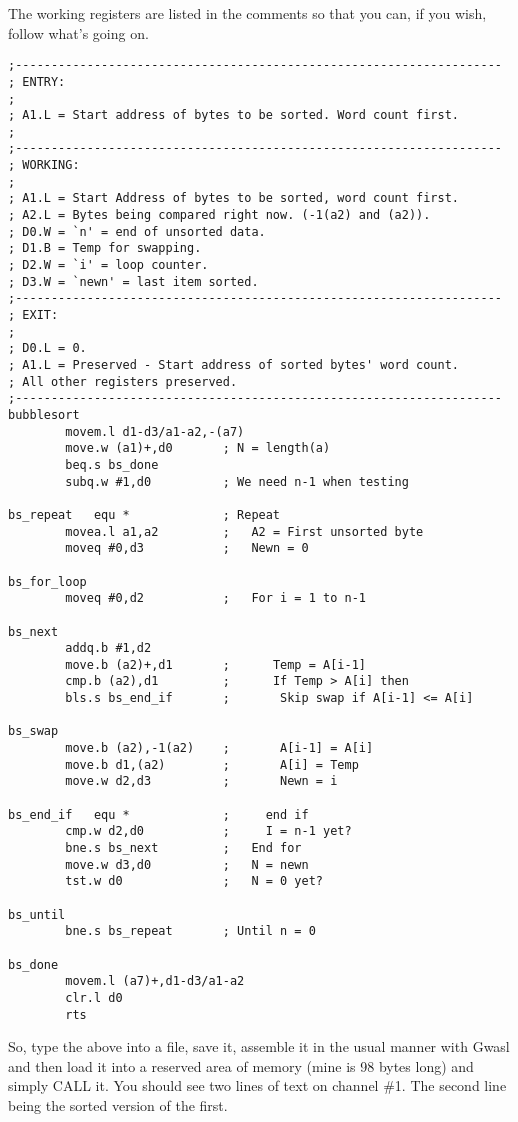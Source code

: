 The working registers are listed in the comments so that you can, if you wish, follow what's going on.

\begin{lstlisting}[firstnumber=last,caption={Bubblesort}]
;--------------------------------------------------------------------
; ENTRY:
;
; A1.L = Start address of bytes to be sorted. Word count first.
;
;--------------------------------------------------------------------
; WORKING:
;
; A1.L = Start Address of bytes to be sorted, word count first.
; A2.L = Bytes being compared right now. (-1(a2) and (a2)).
; D0.W = `n' = end of unsorted data.
; D1.B = Temp for swapping.
; D2.W = `i' = loop counter.
; D3.W = `newn' = last item sorted.
;--------------------------------------------------------------------
; EXIT:
;
; D0.L = 0.
; A1.L = Preserved - Start address of sorted bytes' word count.
; All other registers preserved.
;--------------------------------------------------------------------
bubblesort
        movem.l d1-d3/a1-a2,-(a7)
        move.w (a1)+,d0       ; N = length(a)
        beq.s bs_done
        subq.w #1,d0          ; We need n-1 when testing

bs_repeat   equ *             ; Repeat
        movea.l a1,a2         ;   A2 = First unsorted byte
        moveq #0,d3           ;   Newn = 0

bs_for_loop
        moveq #0,d2           ;   For i = 1 to n-1

bs_next
        addq.b #1,d2
        move.b (a2)+,d1       ;      Temp = A[i-1]
        cmp.b (a2),d1         ;      If Temp > A[i] then
        bls.s bs_end_if       ;       Skip swap if A[i-1] <= A[i]

bs_swap
        move.b (a2),-1(a2)    ;       A[i-1] = A[i]
        move.b d1,(a2)        ;       A[i] = Temp
        move.w d2,d3          ;       Newn = i

bs_end_if   equ *             ;     end if
        cmp.w d2,d0           ;     I = n-1 yet?
        bne.s bs_next         ;   End for
        move.w d3,d0          ;   N = newn
        tst.w d0              ;   N = 0 yet?

bs_until
        bne.s bs_repeat       ; Until n = 0

bs_done
        movem.l (a7)+,d1-d3/a1-a2
        clr.l d0
        rts
\end{lstlisting}

So, type the above into a file, save it, assemble it in the usual manner with Gwasl and then load it into a reserved area of memory (mine is 98 bytes long) and simply CALL it. You should see two lines of text on channel \#1. The second line being the sorted version of the first.

